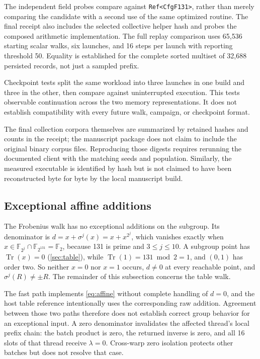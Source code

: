 \documentclass[11pt,a4paper]{article}
\newcommand{\F}{\mathbb{F}}
\newcommand{\code}[1]{\texttt{\small #1}}
\begin{document}
The independent field probes compare against \code{Ref<CfgF131>}, rather than merely comparing the candidate with a second use of the same optimized routine. The final receipt also includes the selected collective helper hash and probes the composed arithmetic implementation. The full replay comparison uses 65,536 starting scalar walks, six launches, and 16 steps per launch with reporting threshold 50. Equality is established for the complete sorted multiset of 32,688 persisted records, not just a sampled prefix.

Checkpoint tests split the same workload into three launches in one build and three in the other, then compare against uninterrupted execution. This tests observable continuation across the two memory representations. It does not establish compatibility with every future walk, campaign, or checkpoint format.

The final collection corpora themselves are summarized by retained hashes and counts in the receipt; the manuscript package does not claim to include the original binary corpus files. Reproducing those digests requires rerunning the documented client with the matching seeds and population. Similarly, the measured executable is identified by hash but is not claimed to have been reconstructed byte for byte by the local manuscript build.

\subsection{Exceptional affine additions}\label{sec:exceptional}
The Frobenius walk has no exceptional additions on the subgroup. Its denominator is $d=x+\sigma^j(x)=x+x^{2^j}$, which vanishes exactly when $x\in\F_{2^j}\cap\F_{2^{131}}=\F_2$, because 131 is prime and $3\le j\le10$. A subgroup point has $\operatorname{Tr}(x)=0$ (\cref{sec:table}), while $\operatorname{Tr}(1)=131\bmod2=1$, and $(0,1)$ has order two. So neither $x=0$ nor $x=1$ occurs, $d\ne0$ at every reachable point, and $\sigma^j(R)\neq\pm R$. The remainder of this subsection concerns the table walk.

The fast path implements \cref{eq:affine} without complete handling of $d=0$, and the host table reference intentionally uses the corresponding raw addition. Agreement between those two paths therefore does not establish correct group behavior for an exceptional input. A zero denominator invalidates the affected thread's local prefix chain: the batch product is zero, the returned inverse is zero, and all 16 slots of that thread receive $\lambda=0$. Cross-warp zero isolation protects other batches but does not resolve that case.
\end{document}
